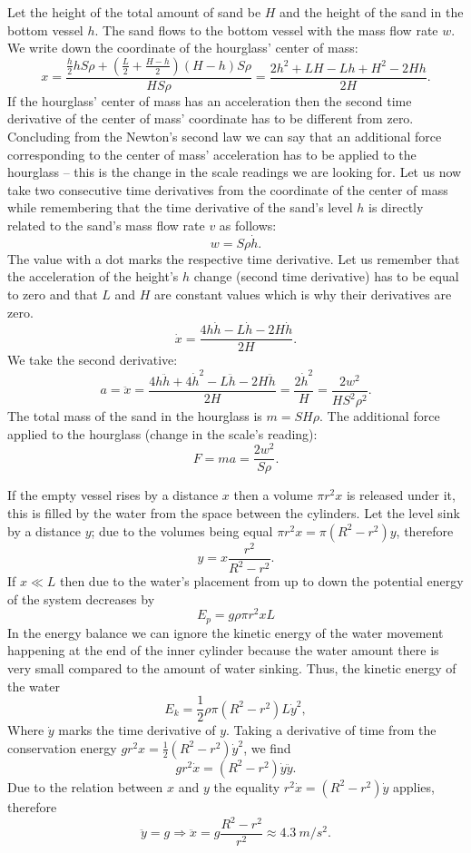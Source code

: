 \documentclass[11pt]{article}
\begin{document}
\solueng
Let the height of the total amount of sand be $H$ and the height of the sand in the bottom vessel $h$. The sand flows to the bottom vessel with the mass flow rate $w$.\\
We write down the coordinate of the hourglass’ center of mass:
\[x=\frac{\frac{h}{2}hS\rho+(\frac{L}{2}+\frac{H-h}{2})(H-h)S\rho}{HS\rho}=\frac{2h^2+LH-Lh+H^2-2Hh}{2H}.\] 
If the hourglass’ center of mass has an acceleration then the second time derivative of the center of mass’ coordinate has to be different from zero. Concluding from the Newton’s second law we can say that an additional force corresponding to the center of mass’ acceleration has to be applied to the hourglass – this is the change in the scale readings we are looking for. Let us now take two consecutive time derivatives from the coordinate of the center of mass while remembering that the time derivative of the sand’s level $h$ is directly related to the sand’s mass flow rate $v$ as follows:
\[w=S\rho\dot{h}.\] 
The value with a dot marks the respective time derivative. Let us remember that the acceleration of the height’s $h$ change (second time derivative) has to be equal to zero and that $L$ and $H$ are constant values which is why their derivatives are zero.
\[\dot{x}=\frac{4h\dot{h}-L\dot{h}-2H\dot{h}}{2H}.\] 
We take the second derivative:
\[a=\ddot{x}=\frac{4h\ddot{h}+4\dot{h}^2-L\ddot{h}-2H\ddot{h}}{2H}=\frac{2\dot{h}^2}{H}=\frac{2w^2}{HS^2\rho^2}.\] 
The total mass of the sand in the hourglass is $m=SH\rho$. The additional force applied to the hourglass (change in the scale’s reading):
\[F=ma=\frac{2w^2}{S\rho}.\]
\probend
\bigskip


\solueng
If the empty vessel rises by a distance $x$ then a volume $\pi r^2 x$ is released under it, this is filled by the water from the space between the cylinders. Let the level sink by a distance $y$; due to the volumes being equal $\pi r^2 x = \pi (R^2-r^2) y$, therefore
$$y=x\frac {r^2}{R^2-r^2}.$$
If $x\ll L$ then due to the water’s placement from up to down the potential energy of the system decreases by
$$E_p=g\rho \pi r^2 x L$$ 
In the energy balance we can ignore the kinetic energy of the water movement happening at the end of the inner cylinder because the water amount there is very small compared to the amount of water sinking. Thus, the kinetic energy of the water
$$E_k=\frac 12 \rho \pi (R^2-r^2) L\dot y^2,$$ 
Where $\dot y$ marks the time derivative of $y$. Taking a derivative of time from the conservation energy $gr^2x=\frac 12(R^2-r^2)\dot y^2$, we find
$$gr^2\dot x=(R^2-r^2)\dot y\ddot y.$$ 
Due to the relation between $x$ and $y$ the equality $r^2\dot x=(R^2-r^2)\dot
y$ applies, therefore
$$\ddot y = g\Rightarrow \ddot x = g\frac
{R^2-r^2}{r^2}\approx\SI{4,3}{m/s^2}.$$
\probend
\bigskip
\end{document}
